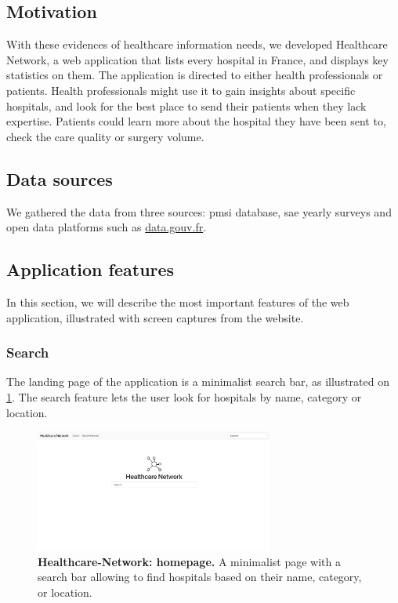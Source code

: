 \subsection{Motivation}

With these evidences of healthcare information needs, we developed Healthcare Network, a web application that lists every hospital in France, and displays key statistics on them. The application is directed to either health professionals or patients. Health professionals might use it to gain insights about specific hospitals, and look for the best place to send their patients when they lack expertise. Patients could learn more about the hospital they have been sent to, check the care quality or surgery volume.

\subsection{Data sources}

We gathered the data from three sources: \ac{pmsi} database, \ac{sae} yearly surveys and open data platforms such as \href{https://data.gouv.fr}{data.gouv.fr}.

\subsection{Application features}

In this section, we will describe the most important features of the web application, illustrated with screen captures from the website.

\subsubsection{Search}

The landing page of the application is a minimalist search bar, as illustrated on \cref{fig:hn-home}. The search feature lets the user look for hospitals by name, category or location.

\begin{figure}[H]
    \includegraphics[width=0.7\textwidth]{images/healthcare-network/home.png}
    \centering
    \caption{
        \textbf{Healthcare-Network: homepage.} A minimalist page with a search bar allowing to find hospitals based on their name, category, or location.
    }
    \label{fig:hn-home}
\end{figure}

